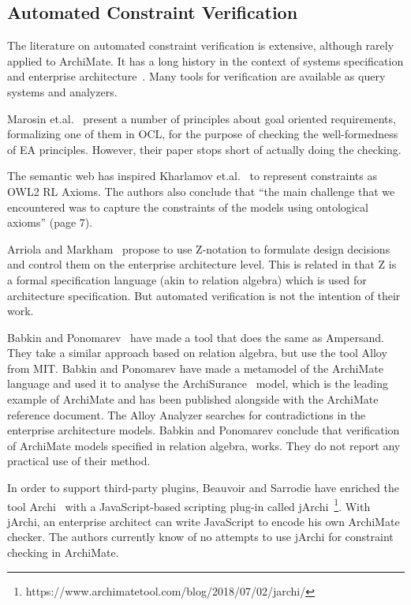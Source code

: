 \documentclass[sn-vancouver]{sn-jnl}%
\theoremstyle{thmstyleone}%
\theoremstyle{thmstyletwo}%
\theoremstyle{thmstylethree}%
\begin{document}
\subsection{Automated Constraint Verification}\label{Verif}
The literature on automated constraint verification is extensive, although rarely applied to ArchiMate.
It has a long history in the context of systems specification and enterprise architecture~\cite{chapurlat2008verification}.
Many tools for verification are available as query systems and analyzers.

Marosin et.al.~\cite{marosin2016principle} present a number of principles about goal oriented requirements, formalizing one of them in OCL,
for the purpose of checking the well-formedness of EA principles. However, their paper stops short of actually doing the checking.

The semantic web has inspired Kharlamov et.al.~\cite{kharlamov2016capturing} to represent constraints as OWL2 RL Axioms.
The authors also conclude that ``the main challenge that we encountered was to capture the constraints of the models using ontological axioms'' (page 7).

Arriola and Markham~\cite{arriola2018towards} propose to use Z-notation to formulate design decisions and control them on the enterprise architecture level.
This is related in that Z is a formal specification language (akin to relation algebra) which is used for architecture specification.
But automated verification is not the intention of their work.

Babkin and Ponomarev~\cite{babkin2017analysis} have made a tool that does the same as Ampersand.
They take a similar approach based on relation algebra, but use the tool Alloy~\cite{Alloy2006} from MIT.
Babkin and Ponomarev have made a metamodel of the ArchiMate language and used it to analyse the ArchiSurance~\cite{ArchiSurance2016} model,
which is the leading example of ArchiMate and has been published alongside with the ArchiMate reference document.
The Alloy Analyzer searches for contradictions in the enterprise architecture models.
Babkin and Ponomarev conclude that verification of ArchiMate models specified in relation algebra, works.
They do not report any practical use of their method.

In order to support third-party plugins,
Beauvoir and Sarrodie have enriched the tool Archi~\cite{Archi} with a JavaScript-based scripting plug-in called jArchi~\footnote{https://www.archimatetool.com/blog/2018/07/02/jarchi/}.
With jArchi, an enterprise architect can write JavaScript to encode his own ArchiMate checker.
The authors currently know of no attempts to use jArchi for constraint checking in ArchiMate.
\end{document}
